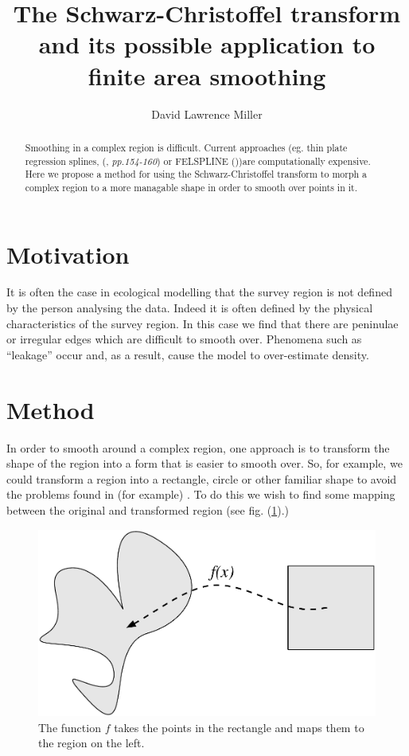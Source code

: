 \documentclass[a4paper,10pt]{amsart}
\title{The Schwarz-Christoffel transform and its possible application to finite area smoothing}
\author{David Lawrence Miller}
\newcommand{\sch}{Schwarz-Christoffel }
\begin{document}
 
\begin{abstract}
Smoothing in a complex region is difficult. Current approaches (eg. thin plate regression splines, (\cite{simonbook}, \emph{pp.154-160}) or FELSPLINE (\cite{ramsay}))are computationally expensive. Here we propose a method for using the \sch transform to morph a complex region to a more managable shape in order to smooth over points in it.
\end{abstract}
 
 
\newtheorem{thm}{Theorem}[section]
 
\newtheorem{defn}{Definition}[section]
 
\maketitle



\section{Motivation}

It is often the case in ecological modelling that the survey region is not defined by the person analysing the data. Indeed it is often defined by the physical characteristics of the survey region. In this case we find that there are peninulae or irregular edges which are difficult to smooth over. Phenomena such as ``leakage'' occur and, as a result, cause the model to over-estimate density.

\section{Method}

In order to smooth around a complex region, one approach is to transform the shape of the region into a form that is easier to smooth over. So, for example, we could transform a region into a rectangle, circle or other familiar shape to avoid the problems found in (for example) \cite{ramsay}. To do this we wish to find some mapping between the original and transformed region (see fig. (\ref{simpledia}).)

\begin{figure} [htbp]
\centering
\includegraphics[scale=0.3]{figs/simpledia.pdf}
\caption{The function $f$ takes the points in the rectangle and maps them to the region on the left.}
\label{simpledia}
\end{figure}
\end{document}
